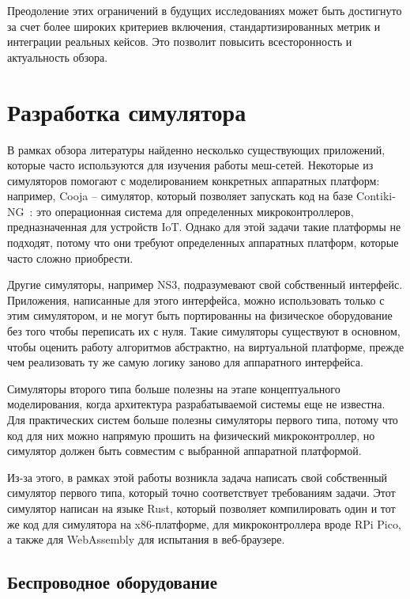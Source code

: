 \documentclass[%
]{report}
\begin{document}
Преодоление этих ограничений
в будущих исследованиях может быть
достигнуто за счет более широких критериев включения,
стандартизированных метрик и интеграции реальных кейсов.
Это позволит повысить всесторонность и актуальность обзора.


\chapter{Разработка симулятора} 
\label{sec:base-section}

В рамках обзора литературы найденно несколько существующих приложений,
которые часто используются для изучения работы меш-сетей.
Некоторые из симуляторов помогают с моделированием конкретных аппаратных платформ:
например, Cooja -- симулятор,
который позволяет запускать код на базе Contiki-NG~\cite{Contiki-NG}:
это операционная система для определенных микроконтроллеров,
предназначенная для устройств IoT.
Однако для этой задачи такие платформы не подходят,
потому что они требуют определенных аппаратных платформ,
которые часто сложно приобрести.

Другие симуляторы, например NS3,
подразумевают свой собственный интерфейс.
Приложения, написанные для этого интерфейса,
можно использовать только с этим симулятором,
и не могут быть портированны на физическое оборудование
без того чтобы переписать их с нуля.
Такие симуляторы существуют в основном,
чтобы оценить работу алгоритмов абстрактно,
на виртуальной платформе,
прежде чем реализовать ту же самую логику
заново для аппаратного интерфейса.

Симуляторы второго типа больше полезны на этапе концептуального моделирования,
когда архитектура разрабатываемой системы еще не известна.
Для практических систем больше полезны симуляторы первого типа,
потому что код для них можно напрямую прошить на физический микроконтроллер, 
но симулятор должен быть совместим с выбранной аппаратной платформой.

Из-за этого, в рамках этой работы возникла задача написать свой собственный симулятор первого типа,
который точно соответствует требованиям задачи.
Этот симулятор написан на языке Rust,
который позволяет компилировать один и тот же код
для симулятора на x86-платформе,
для микроконтроллера вроде RPi Pico,
а также для WebAssembly для испытания в веб-браузере.

\section{Беспроводное оборудование}
\end{document}
